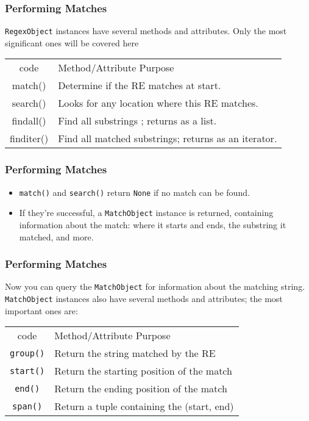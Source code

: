  \begin{frame}[fragile]
\frametitle{Performing Matches } 
\lstinline{RegexObject} instances have several
methods and attributes.  Only the most significant ones will be
covered here
\begin{tabular}{c|l}
code & Method/Attribute  Purpose \\
{match()} & {Determine if the RE matches at start.}\\
  {search()} & {Looks for any location where this RE matches.} \\
  {findall()}&{Find all substrings ; returns as a list.}\\
  {finditer()} & {Find all matched substrings; returns as an iterator.}\\
\end{tabular}
\end{frame}

 \begin{frame}[fragile]
\frametitle{Performing Matches } 

\begin{itemize}
\item \lstinline{match()} and \lstinline|search()| return \lstinline|None| if no match
can be found.  
\item If they're successful, a \lstinline|MatchObject| instance is
returned, containing information about the match: where it starts and
ends, the substring it matched, and more.
\end{itemize}
\end{frame}


 \begin{frame}[fragile]
\frametitle{Performing Matches } 

 Now you can query the \lstinline|MatchObject| for information about the
matching string.  \lstinline|MatchObject| instances also have several
methods and attributes; the most important ones are:
\begin{tabular}{c|l}
code & Method/Attribute  Purpose \\
  \lstinline|group()| & {Return the string matched by the RE}\\
  \lstinline|start()| &{Return the starting position of the match}\\
  \lstinline|end()|&{Return the ending position of the match}\\
  \lstinline|span()|&{Return a tuple containing the (start, end)}\\
\end{tabular}

\end{frame}

